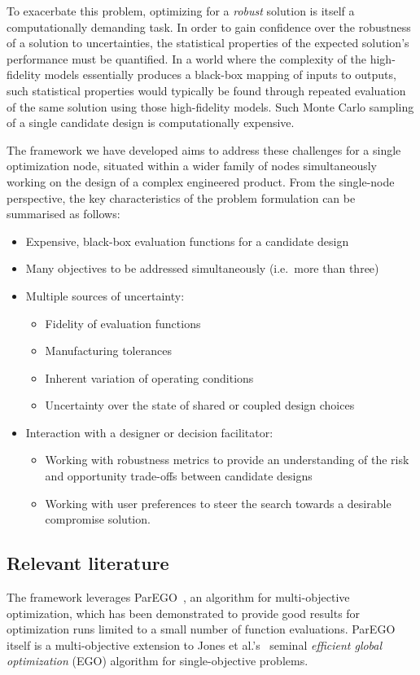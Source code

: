\documentclass[a4paper]{article}
\begin{document}
To exacerbate this problem, optimizing for a \emph{robust} solution is itself a computationally demanding task. In order to gain confidence over the robustness of a solution to uncertainties, the statistical properties of the expected solution's performance must be quantified. In a world where the complexity of the high-fidelity models essentially produces a black-box mapping of inputs to outputs, such statistical properties would typically be found through repeated evaluation of the same solution using those high-fidelity models. Such Monte Carlo sampling of a single candidate design is computationally expensive.

The framework we have developed aims to address these challenges for a single optimization node, situated within a wider family of nodes simultaneously working on the design of a complex engineered product. From the single-node perspective, the key characteristics of the problem formulation can be summarised as follows:
\begin{itemize}
	\item Expensive, black-box evaluation functions for a candidate design
	\item Many objectives to be addressed simultaneously (i.e.~more than three)
	\item Multiple sources of uncertainty:
	\begin{itemize}
		\item Fidelity of evaluation functions
		\item Manufacturing tolerances
		\item Inherent variation of operating conditions
		\item Uncertainty over the state of shared or coupled design choices
	\end{itemize}
	\item Interaction with a designer or decision facilitator:
	\begin{itemize}
		\item Working with robustness metrics to provide an understanding of the risk and opportunity trade-offs between candidate designs
		\item Working with user preferences to steer the search towards a desirable compromise solution.
	\end{itemize}
\end{itemize}

\subsection{Relevant literature}
The framework leverages ParEGO~\cite{knowles2005multiobjective,Knowles2006ParEGO}, an algorithm for multi-objective optimization, which has been demonstrated to provide good results for optimization runs limited to a small number of function evaluations. ParEGO itself is a multi-objective extension to Jones et al.'s~\cite{Jones1998Efficient} seminal \emph{efficient global optimization} (EGO) algorithm for single-objective problems.
\end{document}
